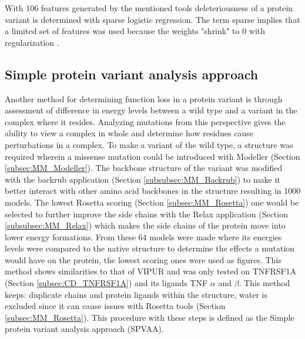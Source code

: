 With 106 features generated by the mentioned tools deleteriousness of a protein variant is determined with sparse logistic regression. The term sparse implies that a limited set of features was used because the weights "shrink" to 0 with regularization \cite{baugh_supplementary:_2016}.
\label{subsec:MM_VIPUR}

\subsection{Simple protein variant analysis approach}
Another method for determining function loss in a protein variant is through assessment of difference in energy levels between a wild type and a variant in the complex where it resides. Analyzing mutations from this perspective gives the ability to view a complex in whole and determine how residues cause perturbations in a complex. To make a variant of the wild type, a structure was required wherein a missense mutation could be introduced with Modeller (Section \ref{subsec:MM_Modeller}). The backbone structure of the variant was modified with the backrub application (Section \ref{subsubsec:MM_Backrub}) to make it better interact with other amino acid backbones in the structure resulting in 1000 models. The lowest Rosetta scoring (Section \ref{subsec:MM_Rosetta}) one would be selected to further improve the side chains with the Relax application
 (Section \ref{subsubsec:MM_Relax}) which makes the side chains of the protein move into lower energy formations. From these 64 models were made where its energies levels were compared to the native structure to determine the effects a mutation would have on the protein, the lowest scoring ones were used as figures. This method shows similarities to that of VIPUR and was only tested on TNFRSF1A (Section \ref{subsec:CD_TNFRSF1A}) and its ligands TNF $\alpha$ and $\beta$. This method keeps: duplicate chains and protein ligands within the structure, water is excluded since it can cause issues with Rosetta tools (Section \ref{subsec:MM_Rosetta}). This procedure with these steps is defined as the Simple protein variant analysis approach (SPVAA).
\label{subsec:MM_SPVAA}

